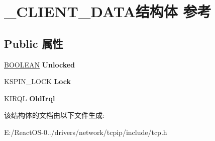 \hypertarget{struct___c_l_i_e_n_t___d_a_t_a}{}\section{\+\_\+\+C\+L\+I\+E\+N\+T\+\_\+\+D\+A\+T\+A结构体 参考}
\label{struct___c_l_i_e_n_t___d_a_t_a}
\subsection*{Public 属性}
\begin{DoxyCompactItemize}
\item 
\mbox{\label{struct___c_l_i_e_n_t___d_a_t_a_a3d763b0c242bc401d133e8867930e82b}} 
\hyperlink{_processor_bind_8h_a112e3146cb38b6ee95e64d85842e380a}{B\+O\+O\+L\+E\+AN} {\bfseries Unlocked}
\item 
\mbox{\label{struct___c_l_i_e_n_t___d_a_t_a_a6fd8b7b3f4bf6e5d08f7013695113727}} 
K\+S\+P\+I\+N\+\_\+\+L\+O\+CK {\bfseries Lock}
\item 
\mbox{\label{struct___c_l_i_e_n_t___d_a_t_a_ab518584e8b4a3ac274099fba1be61090}} 
K\+I\+R\+QL {\bfseries Old\+Irql}
\end{DoxyCompactItemize}


该结构体的文档由以下文件生成\+:\begin{DoxyCompactItemize}
\item 
E\+:/\+React\+O\+S-\/0../drivers/network/tcpip/include/tcp.\+h\end{DoxyCompactItemize}
